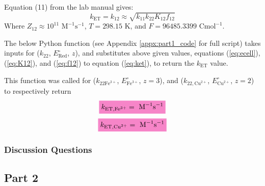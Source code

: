 Equation (11) from the lab manual\autocite{lab_manual} gives:
\begin{equation}
    k_{\text{ET}} = k_{12} \approx \sqrt{k_{11}k_{22}K_{12}f_{12}}
    \label{eq:ket}
\end{equation}
Where $Z_{12} \approx 10^{11} \text{ M}^{-1} \text{s}^{-1}$, $T = 298.15\text{ K}$, and $F = 96485.3399 \text{ Cmol}^{-1}$.
\\
\par The below Python function (see Appendix \ref{appx:part1_code} for full script) takes inputs for ($k_{22}$, $E^{\circ}_{\text{Red}}$, $z$), and substitutes above given values, equations (\ref{eq:ecell}), (\ref{eq:K12}), and (\ref{eq:f12}) to equation (\ref{eq:ket}), to return the $k_{\text{ET}}$ value.

This function was called for ($k_{22 \text{Fe}^{3+}}$, $E^{\circ}_{\text{Fe}^{3+}}$, $z = 3$), and ($k_{22, \text{Cu}^{2+}}$, $E^{\circ}_{\text{Cu}^{2+}}$, $z = 2$) to respectively return
\begin{equation*}
    \mathcolorbox{Lavender}{k_{\text{ET},\text{Fe}^{3+}} =  \text{ M}^{-1} \text{s}^{-1}}
\end{equation*}
\begin{equation*}
    \mathcolorbox{Lavender}{k_{\text{ET},\text{Cu}^{2+}} =  \text{ M}^{-1} \text{s}^{-1}}
\end{equation*}

\subsubsection*{Discussion Questions}

\subsection{Part 2}





